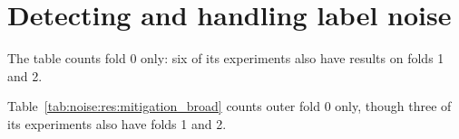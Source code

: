 

\section{Detecting and handling label noise}\label{app:add:noise}

\begin{landscape}
\label{app:add:noise_bygroup}
The table counts fold 0 only: six of its experiments also have results on folds 1 and 2.


\end{landscape}


\label{app:add:noise_mitigation_broad}


Table~\ref{tab:noise:res:mitigation_broad} counts outer fold 0 only, though three of its experiments also have folds 1 and 2.

